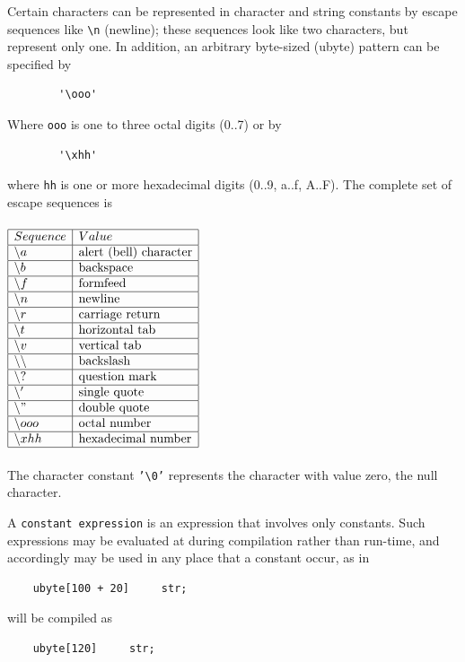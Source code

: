 \documentclass{scrartcl}
\begin{document}
            Certain characters can be represented in character and string constants
            by escape sequences like \texttt{\textbackslash n} (newline); these sequences look
            like two characters, but represent only one. In addition, an arbitrary
            byte-sized (ubyte) pattern can be specified by
            \begin{lstlisting}
        '\ooo'
            \end{lstlisting}
            Where \texttt{ooo} is one to three octal digits (0..7) or by
            \begin{lstlisting}
        '\xhh'
            \end{lstlisting}
            where \texttt{hh} is one or more hexadecimal digits (0..9, a..f, A..F).
            The complete set of escape sequences is
\\\\
$\begin{array}{|l|l|}
\hline
Sequence & Value\\
\hline
\backslash a & \text{alert (bell) character} \\
\hline
\backslash b & \text{backspace} \\
\hline
\backslash f & \text{formfeed} \\
\hline
\backslash n & \text{newline} \\
\hline
\backslash r & \text{carriage return} \\
\hline
\backslash t & \text{horizontal tab} \\
\hline
\backslash v & \text{vertical tab} \\
\hline
\backslash \backslash & \text{backslash} \\
\hline
\backslash ? & \text{question mark} \\
\hline
\backslash ' & \text{single quote} \\
\hline
\backslash " & \text{double quote} \\
\hline
\backslash ooo & \text{octal number} \\
\hline
\backslash xhh & \text{hexadecimal number} \\
\hline
\end{array}$
\\\\
        The character constant \texttt{'\textbackslash 0'} represents the character
        with value zero, the null character.

        A \texttt{constant expression} is an expression that involves only constants.
        Such expressions may be evaluated at during compilation rather than run-time,
        and accordingly may be used in any place that a constant occur, as in
        \begin{lstlisting}
    ubyte[100 + 20]     str;
        \end{lstlisting}
        will be compiled as
        \begin{lstlisting}
    ubyte[120]     str;
        \end{lstlisting}
\end{document}
